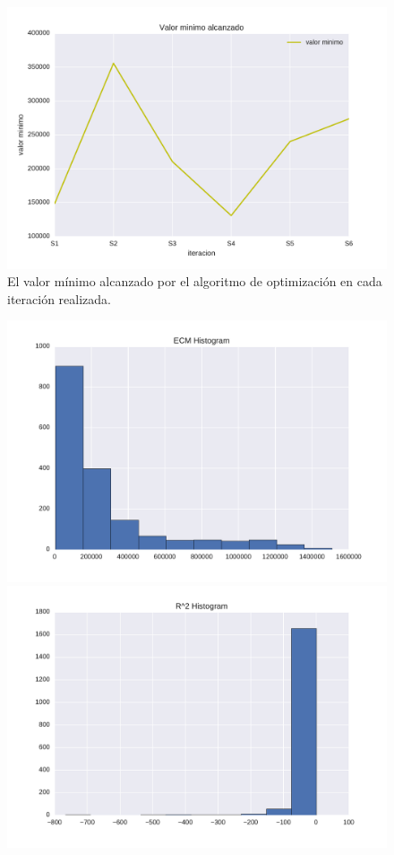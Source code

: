 \documentclass[a4paper,10pt]{article}%
\begin{document}
\begin{figure}[H]
\centering        
\includegraphics[scale=0.7]{opt_vals.pdf}
\caption{El valor mínimo alcanzado por el algoritmo de optimización en cada iteración realizada. }
\label{opt_vals}
\end{figure}


\begin{figure}[H]
\includegraphics[scale=0.4]{mse_hist_s180937.pdf}
\includegraphics[scale=0.4]{cdet_hist_s180937.pdf}
\end{figure}
\end{document}

